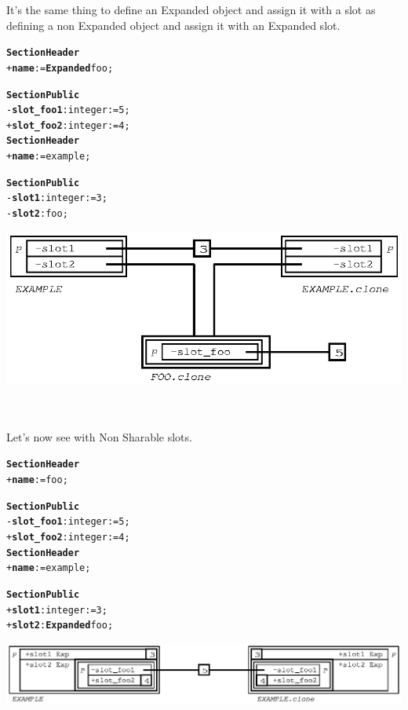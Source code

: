 \documentclass[11pt]{mybook}
\begin{document}
It's the same thing to define an Expanded object and assign it with a slot as defining a non Expanded object and assign it with an Expanded slot.

\begin{alltt}
{\bf{}Section Header}
  + {\bf{}name} := {\bf{}Expanded} {\sc{}foo};

{\bf{}Section Public}
  - {\bf{}slot\_foo1}:{\sc{}integer} := 5;
  + {\bf{}slot\_foo2}:{\sc{}integer} := 4;\\

{\bf{}Section Header}
  + {\bf{}name} := {\sc{}example};

{\bf{}Section Public}
  - {\bf{}slot1}:{\sc{}integer} := 3;
  - {\bf{}slot2}:{\sc{}foo};
\end{alltt}

\begin{center}
\includegraphics[scale=1.0]{figures/expanded_slot}
\end{center}

~\\
~\\
Let's now see with Non Sharable slots.

\begin{alltt}
{\bf{}Section Header}
  + {\bf{}name} := {\sc{}foo};

{\bf{}Section Public}
  - {\bf{}slot\_foo1}:{\sc{}integer} := 5;
  + {\bf{}slot\_foo2}:{\sc{}integer} := 4;\\

{\bf{}Section Header}
  + {\bf{}name} := {\sc{}example};

{\bf{}Section Public}
  + {\bf{}slot1}:{\sc{}integer} := 3;
  + {\bf{}slot2}:{\bf{}Expanded} {\sc{}foo};
\end{alltt}

\begin{center}
\includegraphics[scale=1.0]{figures/expanded_slot2}
\end{center}
\end{document}
